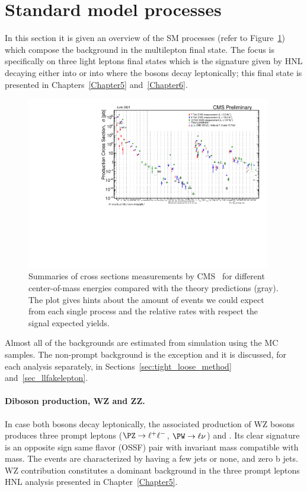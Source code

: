 \section{Standard model processes}\label{sec:c4sm}
In this section it is given an overview of the SM processes (refer to Figure~\ref{fig:crosssection}) which
compose the background in the multilepton final state. The focus is
specifically on three light leptons final states which is the
signature given by HNL decaying either into \PZ or into \PW where the bosons
decay leptonically; this final state is presented in
Chapters~\ref{Chapter5} and~\ref{Chapter6}.
\begin{figure}[h]
\centering
  \includegraphics[width=0.95\textwidth]{Figures/c4/SigmaNew_v0.pdf}
  \caption{Summaries of cross sections measurements by CMS~\cite{cmspublic} for
    different center-of-mass energies compared with the theory
    predictions (gray). The plot gives hints about the
    amount of events we could expect from each single process and the
    relative rates with respect the signal expected yields.}
  \label{fig:crosssection}
\end{figure}

Almost all of the backgrounds are estimated from simulation using the
MC samples. The non-prompt background is the exception and it is
discussed, for each analysis separately, in Sections~\ref{sec:tight_loose_method}
and~\ref{sec_llfakelepton}. 

\paragraph{Diboson production, WZ and ZZ.}\label{sec:c4wz_zz}
In case both bosons decay leptonically, the associated production of
WZ bosons produces three prompt leptons ($\PZ \rightarrow \ell^{+}
\ell^{-}$, $\PW \rightarrow \ell \nu$) and \ptmiss.
Its clear signature is an opposite sign same flavor (OSSF) pair with
invariant mass compatible with \PZ mass. The events are characterized by
having a few jets or none, and zero b jets.
WZ contribution
constitutes a dominant background in the three prompt leptons HNL
analysis presented in Chapter~\ref{Chapter5}.

